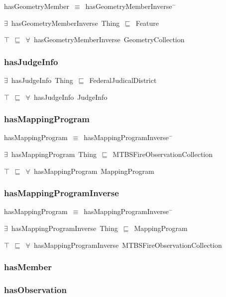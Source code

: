 \documentclass{article}
\begin{document}
hasGeometryMember~\ensuremath{\equiv}~hasGeometryMemberInverse\ensuremath{^-}

\ensuremath{\exists}~hasGeometryMemberInverse~Thing~\ensuremath{\sqsubseteq}~Feature

\ensuremath{\top}~\ensuremath{\sqsubseteq}~\ensuremath{\forall}~hasGeometryMemberInverse~GeometryCollection

\subsubsection*{hasJudgeInfo}

\ensuremath{\exists}~hasJudgeInfo~Thing~\ensuremath{\sqsubseteq}~FederalJudicalDistrict

\ensuremath{\top}~\ensuremath{\sqsubseteq}~\ensuremath{\forall}~hasJudgeInfo~JudgeInfo

\subsubsection*{hasMappingProgram}

hasMappingProgram~\ensuremath{\equiv}~hasMappingProgramInverse\ensuremath{^-}

\ensuremath{\exists}~hasMappingProgram~Thing~\ensuremath{\sqsubseteq}~MTBSFireObservationCollection

\ensuremath{\top}~\ensuremath{\sqsubseteq}~\ensuremath{\forall}~hasMappingProgram~MappingProgram

\subsubsection*{hasMappingProgramInverse}

hasMappingProgram~\ensuremath{\equiv}~hasMappingProgramInverse\ensuremath{^-}

\ensuremath{\exists}~hasMappingProgramInverse~Thing~\ensuremath{\sqsubseteq}~MappingProgram

\ensuremath{\top}~\ensuremath{\sqsubseteq}~\ensuremath{\forall}~hasMappingProgramInverse~MTBSFireObservationCollection

\subsubsection*{hasMember}

\subsubsection*{hasObservation}
\end{document}
